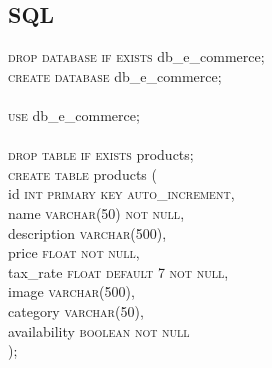 \documentclass{article}
\begin{document}

\subsection{SQL}
\textsc{\textcolor{sentence}{drop database if exists}} db\_e\_commerce;\\
\textsc{\textcolor{sentence}{create database}} db\_e\_commerce;\\\\
\textsc{\textcolor{sentence}{use}} db\_e\_commerce;\\\\
\textsc{\textcolor{sentence}{drop table if exists}} products;\\
\textsc{\textcolor{sentence}{create table}} products (\\
\phantom{abc} id \textsc{\textcolor{sentence}{int primary key auto\_increment}},\\
\phantom{abc} name \textsc{\textcolor{sentence}{varchar\textcolor{numberSQL}{(50)} not null}},\\
\phantom{abc} description \textsc{\textcolor{sentence}{varchar\textcolor{numberSQL}{(500)}}},\\
\phantom{abc} price \textsc{\textcolor{sentence}{float not null}},\\
 \phantom{abc} tax\_rate \textsc{\textcolor{sentence}{float default \textcolor{numberSQL}{7} not null}},\\
\phantom{abc} image \textsc{\textcolor{sentence}{varchar\textcolor{numberSQL}{(500)}}},\\
\phantom{abc} category \textsc{\textcolor{sentence}{varchar\textcolor{numberSQL}{(50)}}},\\
 \phantom{abc} availability \textsc{\textcolor{sentence}{boolean not null}}\\);\\\\
\end{document}
